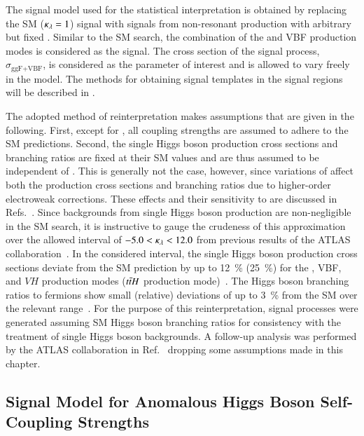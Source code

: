 The signal model used for the statistical interpretation is obtained
by replacing the SM \HH ($\kappa_{\lambda} = 1$) signal with signals from
non-resonant \HH production with arbitrary but fixed \klambda. Similar
to the SM \HH search, the combination of the \ggF and VBF production
modes is considered as the signal. The cross section of the signal
process, $\sigma_{\text{ggF+VBF}}$, is considered as the parameter of
interest and is allowed to vary freely in the model. The methods for
obtaining signal templates in the signal regions will be described in
.

The adopted method of reinterpretation makes assumptions that are
given in the following. First, except for \klambda, all coupling
strengths are assumed to adhere to the SM predictions. Second, the
single Higgs boson production cross sections and branching ratios are
fixed at their SM values and are thus assumed to be independent of
\klambda. This is generally not the case, however, since variations of
\klambda affect both the production cross sections and branching
ratios due to higher-order electroweak corrections. These effects and
their sensitivity to \klambda are discussed in
Refs.~\cite{ATL-PHYS-PUB-2019-009,Degrassi:2016wml,Maltoni:2017ims}.
Since backgrounds from single Higgs boson production are
non-negligible in the SM \HH search, it is instructive to gauge the
crudeness of this approximation over the allowed interval of
$-5.0 < \kappa_{\lambda} < 12.0$ from previous results of the ATLAS
collaboration~\cite{HDBS-2018-58}. In the considered \klambda
interval, the single Higgs boson production cross sections deviate
from the SM prediction by up to \SI{12}{\percent} (\SI{25}{\percent})
for the \ggF, VBF, and $VH$ production modes ($t\bar{t} H$ production
mode)~\cite{ATL-PHYS-PUB-2019-009}. The Higgs boson branching ratios
to fermions show small (relative) deviations of up to \SI{3}{\percent}
from the SM over the relevant \klambda
range~\cite{ATL-PHYS-PUB-2019-009}. For the purpose of this
reinterpretation, signal processes were generated assuming SM Higgs
boson branching ratios for consistency with the treatment of single
Higgs boson backgrounds. A follow-up analysis was performed by the
ATLAS collaboration in Ref.~\cite{ATL-HDBS-2022-03-002} dropping some
assumptions made in this chapter.


\subsection{Signal Model for Anomalous Higgs Boson Self-Coupling Strengths}%
\label{sec:self_coupling_signals}


